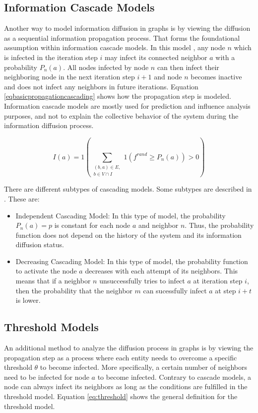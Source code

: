 \subsection{Information Cascade Models}

Another way to model information diffusion in graphs is by viewing the diffusion as a 
sequential information propagation process. That forms the foundational 
assumption within information cascade models. In this model 
\cite{reviewinformationdiffusion}, any node $n$ which is infected in the
iteration step $i$ may infect its connected neighbor $a$ with a 
probability $P_n(a)$. All nodes infected by node $n$
can then infect their neighboring node in the next iteration step $i+1$
and node $n$ becomes inactive and does not infect any neighbors in future
iterations.
Equation \ref{eqbasicpropagationcascading} 
shows how the propagation step is modeled.
Information cascade models are mostly used for prediction and influence 
analysis purposes, and not to explain the collective behavior
of the system during the information diffusion process.

\begin{equation}
    I(a) = 1 \left (\sum\limits_{\substack{(b,a)\in E, \\ b \in V \cap I}}
    1(f^{rand}\geq P_n(a))>0 \right ) 
    \label{eqbasicpropagationcascading}
\end{equation}

There are different subtypes of cascading models.
Some subtypes are described in \cite{diffusionbasics}. These are:

\begin{itemize}
    \item Independent Cascading Model: In this type of model, the 
    probability $P_n(a)=p$ is constant for each node $a$ and neighbor $n$.
    Thus, the probability function does not depend on the history 
    of the system and its information diffusion status.
    \item Decreasing Cascading Model: In this type of model, the probability
    function to activate the node $a$ decreases with each attempt of its 
    neighbors. This means that if a neighbor $n$ unsuccessfully tries to infect
    $a$ at iteration step $i$, then the probability that the neighbor $m$
    can sucessfully infect $a$ at step $i+t$ is lower.
\end{itemize}

\subsection{Threshold Models}
An additional method to analyze the diffusion process in graphs is by viewing the
propagation step as a process where each entity needs to overcome a 
specific threshold $\theta$ to become infected. More specifically, 
a certain number of neighbors need to be infected for node $a$ to become 
infected. Contrary to cascade models, a node can always 
infect its neighbors as long as the conditions are fulfilled in the threshold 
model. Equation \ref{eq:threshold} shows the general definition 
for the threshold model.

